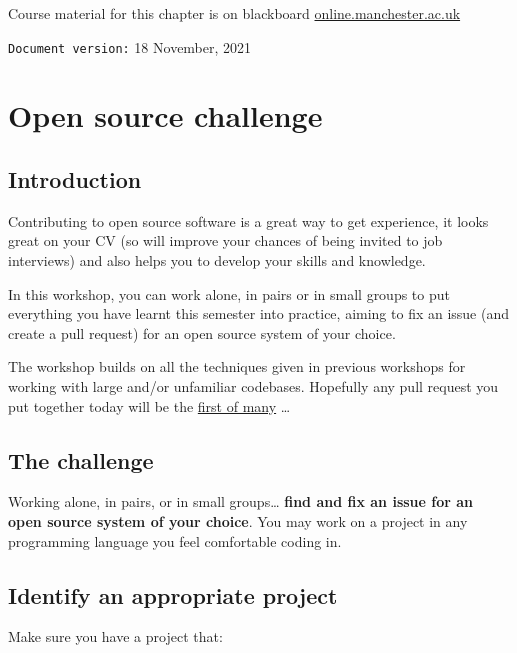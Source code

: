 \documentclass[
]{book}
\begin{document}
Course material for this chapter is on blackboard \href{https://online.manchester.ac.uk}{online.manchester.ac.uk}

\texttt{Document\ version:} 18 November, 2021

\hypertarget{opening}{%
\chapter{Open source challenge}\label{opening}}

\hypertarget{introduction-1}{%
\section{Introduction}\label{introduction-1}}

Contributing to open source software is a great way to get experience, it looks great on your CV (so will improve your chances of being invited to job interviews) and also helps you to develop your skills and knowledge. \citep{experiencing, spinellis}

In this workshop, you can work alone, in pairs or in small groups to put everything you have learnt this semester into practice, aiming to fix an issue (and create a pull request) for an open source system of your choice.

The workshop builds on all the techniques given in previous workshops for working with large and/or unfamiliar codebases.
Hopefully any pull request you put together today will be the \href{http://firstpr.me}{first of many} \ldots{}

\hypertarget{challenge}{%
\section{The challenge}\label{challenge}}

Working alone, in pairs, or in small groups\ldots{} \textbf{find and fix an issue for an open source system of your choice}.
You may work on a project in any programming language you feel comfortable coding in.

\hypertarget{projecti}{%
\section{Identify an appropriate project}\label{projecti}}

Make sure you have a project that:
\end{document}
